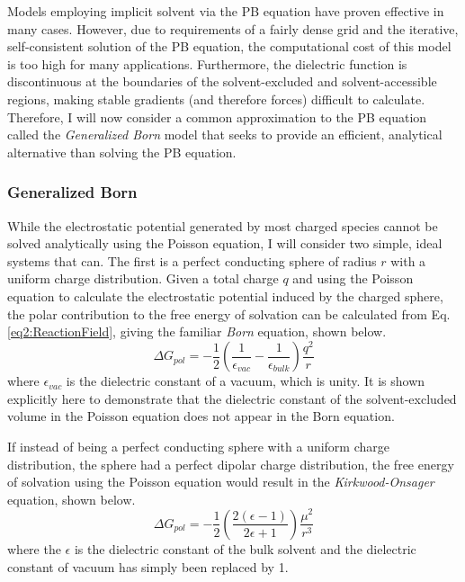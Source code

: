 Models employing implicit solvent via the PB equation have proven
effective in many cases. \cite{Klapper_Proteins_1986_v1_p47,
Gilson_JComputChem_1988_v9_p327, Baker_ProcNatlAcadSci_2001_v98_p10037,
Nielsen_Proteins_2001_v43_p403} However, due to requirements of a fairly dense
grid and the iterative, self-consistent solution of the PB equation, the
computational cost of this model is too high for many applications. Furthermore,
the dielectric function is discontinuous at the boundaries of the
solvent-excluded and solvent-accessible regions, making stable gradients (and
therefore forces) difficult to calculate.
\cite{Wang_ChemPhysLett_2009_v468_p112} Therefore, I will now consider a common
approximation to the PB equation called the \emph{Generalized Born} model that
seeks to provide an efficient, analytical alternative than solving the PB
equation.

\subsubsection{Generalized Born}

While the electrostatic potential generated by most charged species cannot be
solved analytically using the Poisson equation, I will consider two simple,
ideal systems that can. The first is a perfect conducting sphere of radius $r$
with a uniform charge distribution. Given a total charge $q$ and using the
Poisson equation to calculate the electrostatic potential induced by the charged
sphere, the polar contribution to the free energy of solvation can be calculated
from Eq. \ref{eq2:ReactionField}, giving the familiar \emph{Born} equation,
shown below. \cite{Cramer_Book_EssentialsCompChem_2004}
\begin{equation}
   \Delta G _ {pol} = - \frac 1 2 \left( \frac 1 {\epsilon_{vac}} - \frac 1
         {\epsilon_{bulk}} \right) \frac {q ^ 2} r
   \label{eq2:Born}
\end{equation}
where $\epsilon_{vac}$ is the dielectric constant of a vacuum, which is unity.
It is shown explicitly here to demonstrate that the dielectric constant of the
solvent-excluded volume in the Poisson equation does not appear in the Born
equation.

If instead of being a perfect conducting sphere with a uniform charge
distribution, the sphere had a perfect dipolar charge distribution, the free
energy of solvation using the Poisson equation would result in the
\emph{Kirkwood-Onsager} equation, shown below.
\cite{Cramer_Book_EssentialsCompChem_2004}
\begin{equation}
   \Delta G _ {pol} = - \frac 1 2 \left ( \frac {2 ( \epsilon - 1 )} {2 \epsilon
         + 1} \right ) \frac {\mu ^ 2} {r ^ 3}
   \label{eq2:KirkwoodOnsager}
\end{equation}
where the $\epsilon$ is the dielectric constant of the bulk solvent and the
dielectric constant of vacuum has simply been replaced by 1.

